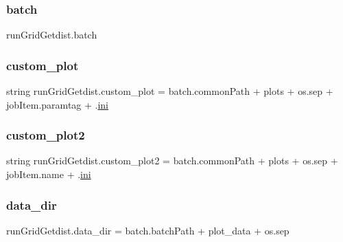 \subsubsection{\texorpdfstring{batch}{batch}}
{\footnotesize\ttfamily run\+Grid\+Getdist.\+batch}

\mbox{\label{namespacerunGridGetdist_aef778b568c58613ea29e2637d49d8e04}} 
\subsubsection{\texorpdfstring{custom\+\_\+plot}{custom\_plot}}
{\footnotesize\ttfamily string run\+Grid\+Getdist.\+custom\+\_\+plot = batch.\+common\+Path + \textquotesingle{}plots\textquotesingle{} + os.\+sep + job\+Item.\+paramtag + \textquotesingle{}.\mbox{\hyperlink{namespacerunGridGetdist_a5c45b173d8ff043e9a4f7dd67d9e5076}{ini}}\textquotesingle{}}

\mbox{\label{namespacerunGridGetdist_a0eb2709c4e717d93799be0aded61f5f1}} 
\subsubsection{\texorpdfstring{custom\+\_\+plot2}{custom\_plot2}}
{\footnotesize\ttfamily string run\+Grid\+Getdist.\+custom\+\_\+plot2 = batch.\+common\+Path + \textquotesingle{}plots\textquotesingle{} + os.\+sep + job\+Item.\+name + \textquotesingle{}.\mbox{\hyperlink{namespacerunGridGetdist_a5c45b173d8ff043e9a4f7dd67d9e5076}{ini}}\textquotesingle{}}

\mbox{\label{namespacerunGridGetdist_ad04f8846c3ee6d85a6faaedf8a3e3af8}} 
\subsubsection{\texorpdfstring{data\+\_\+dir}{data\_dir}}
{\footnotesize\ttfamily run\+Grid\+Getdist.\+data\+\_\+dir = batch.\+batch\+Path + \textquotesingle{}plot\+\_\+data\textquotesingle{} + os.\+sep}

